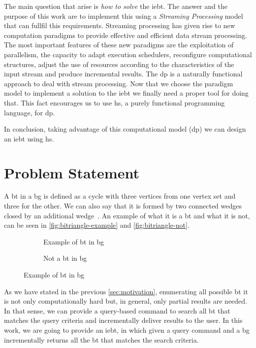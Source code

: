 The main question that arise is \emph{how to solve} the \acrshort{iebt}. The answer and the purpose of this work are to implement this using a \emph{Streaming Processing} model that can fullfil this requirements.
Streaming processing has given rise to new computation paradigms to provide effective and efficient data stream processing.
The most important features of these new paradigms are the exploitation of parallelism, the capacity to adapt execution schedulers, 
reconfigure computational structures, adjust the use of resources according to the characteristics of the input stream and produce incremental results. 
The \acrfull{dp} is a naturally functional approach to deal with stream processing. 
Now that we choose the paradigm model to implement a solution to the \acrshort{iebt} we finally need a proper tool for doing that. 
This fact encourages us to use \acrlong{hs}, a purely functional programming language, for \acrshort{dp}.

In conclusion, taking advantage of this computational model (\acrshort{dp}) we can design an \acrshort{iebt} using \acrshort{hs}.

\section{Problem Statement}
A \acrlong{bt} in a \acrlong{bg} is defined as a cycle with three vertices from one vertex set and three for the other. We can also say that it is formed by two connected wedges closed by an additional wedge~\cite{btcount}.
An example of what it is a \acrshort{bt} and what it is not, can be seen in \autoref{fig:bitriangle-example} and \autoref{fig:bitriangle-not}.

\begin{figure}[htp!]
\begin{subfigure}[b]{0.5\textwidth}
\centering
{}
\caption{Example of \acrshort{bt} in \acrshort{bg}}
\label{fig:bitriangle-example}
\end{subfigure}
\begin{subfigure}[b]{0.5\textwidth}
\centering
{}
\caption{Not a \acrshort{bt} in \acrshort{bg}}
\label{fig:bitriangle-not}
\end{subfigure}
\caption[Example of \acrshort{bt} in \acrshort{bg}]{Example of \acrshort{bt} in \acrshort{bg}}
\end{figure}

As we have stated in the previous \autoref{sec:motivation}, enumerating all possible \acrshort{bt} it is not only computationally hard but, in general, only partial results are needed.
In that sense, we can provide a query-based command to search all \acrshort{bt} that matches the query criteria and incrementally deliver results to the user.
In this work, we are going to provide an \acrfull{iebt}, in which given a query command and a \acrlong{bg} incrementally returns all the \acrlong{bt} that matches the search criteria.

